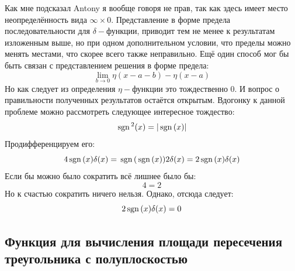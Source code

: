 Как мне подсказал Antony я вообще говоря не прав, так как здесь имеет место неопределённость вида $\infty\times 0$. Представление в форме предела последовательности для $\delta-$функции, приводит тем не менее к результатам изложенным выше, но при одном дополнительном условии, что пределы можно менять местами, что скорее всего также неправильно. Ещё один способ мог бы быть связан с представлением решения в форме предела:
\[
	\lim\limits_{b \to 0} \eta(x - a - b) - \eta(x - a)
\]
Но как следует из определения $\eta-$функции это тождественно 0. И вопрос о правильности полученных результатов остаётся открытым. Вдогонку к данной проблеме можно рассмотреть следующее интересное тождество:
\[
	\mathrm{\,sgn}\,^2(x) = |\mathrm{\,sgn}\,(x)|
\]
Продифференцируем его:
\[
	4 \mathrm{\,sgn}\,(x) \delta(x) = \mathrm{\,sgn}\,(\mathrm{\,sgn}\,(x)) 2\delta(x) = 2 \mathrm{\,sgn}\,(x) \delta(x) 
\]
Если бы можно было сократить всё лишнее было бы:
\[
	4 = 2
\]
Но к счастью сократить ничего нельзя. Однако, отсюда следует:
\[
	 2 \mathrm{\,sgn}\,(x) \delta(x) = 0
\]

\subsection{Функция для вычисления площади пересечения треугольника с полуплоскостью}

